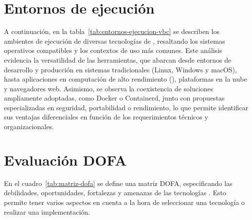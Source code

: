 \section{Entornos de ejecución}
\noindent
A continuación, en la tabla~\ref{tab:entornos-ejecucion-vbc} se describen los ambientes de ejecución de diversas tecnologías de \VBC, resaltando los sistemas operativos compatibles y los contextos de uso más comunes. Este análisis evidencia la versatilidad de las herramientas, que abarcan desde entornos de desarrollo y producción en sistemas tradicionales (Linux, Windows y macOS), hasta aplicaciones en computación de alto rendimiento (\HPC), plataformas en la nube y navegadores web. Asimismo, se observa la coexistencia de soluciones ampliamente adoptadas, como Docker o Containerd, junto con propuestas especializadas en seguridad, portabilidad o rendimiento, lo que permite identificar sus ventajas diferenciales en función de los requerimientos técnicos y organizacionales.


\section{Evaluación DOFA}
\noindent
En el cuadro~\ref{tab:matriz-dofa} se define una matriz DOFA, especificando las debilidades, oportunidades, fortalezas y amenazas de las tecnologías \VBC. Esto permite tener varios aspectos en cuenta a la hora de seleccionar una tecnología o realizar una implementación.

